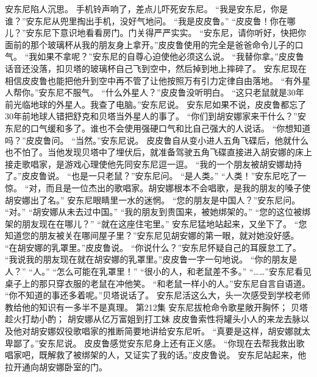 \documentclass[a4paper,12pt,UTF8,twoside]{ctexbook}
\begin{document}
        安东尼陷人沉思。 
        手机铃声响了，差点儿吓死安东尼。 
        “我是安东尼，你是谁？”安东尼从兜里掏出手机，没好气地问。 
        “我是皮皮鲁。” 
        “皮皮鲁！你在哪儿？”安东尼下意识地看看房门。门关得严严实实。 
        “安东尼，请你听好，快把你面前的那个玻璃杯从我的朋友身上拿开。”皮皮鲁使用的完全是爸爸命令儿子的口气。 
        “我如果不拿呢？”安东尼的自尊心迫使他必须这么说。 
        “我替你拿。”皮皮鲁话音还没落，扣贝塔的玻璃杯自己飞到空中，然后掉到地上摔碎了。 
        安东尼现在相信皮皮鲁也能把他升到空中再不管了让他按照万有引力定律自由落地。 
       “有外星人帮你。”安东尼不服气。 
        “什么外星人？”皮皮鲁没听明白。 
        “这只老鼠就是30年前光临地球的外星人。我查了电脑。”安东尼说。 
        安东尼如果不说，皮皮鲁都忘了30年前地球人错把舒克和贝塔当外星人的事了。 
        “你们到胡安娜家来干什么？”安东尼的口气缓和多了。谁也不会使用强硬口气和比自己强大的人说话。 
        “你想知道吗？”皮皮鲁问。 
        “当然。”安东尼说。 
        皮皮鲁自从变小进人五角飞碟后，他就什么也不怕了。当他发现贝塔中了埋伏后，就准备驾驶五角飞碟直接进入胡安娜的床上接走歌唱家，是游戏心理使他先同安东尼逗一逗。 
        “我的一个朋友被胡安娜劫持了。”皮皮鲁说。 
        “也是一只老鼠？”安东尼问。 
        “是人类。” 
        “人类！”安东尼吃了一惊。 
        “对，而且是一位杰出的歌唱家。胡安娜根本不会唱歌，是我的朋友的嗓子使胡安娜出了名。” 
        安东尼眼睛里一水的迷惘。 
        “您的朋友是中国人？”安东尼问。 
        “对。” 
        “胡安娜从未去过中国。” 
        “我的朋友到贵国来，被她绑架的。” 
        “您的这位被绑架的朋友现在在哪儿？” 
        “就在这座住宅里。” 
        安东尼猛地站起来，又坐下了。 
        “您知道您的朋友被关在哪间屋子里？”安东尼见胡安娜的第一眼，就对她没好感。 
        “在胡安娜的乳罩里。”皮皮鲁说。 
        “你说什么？”安东尼怀疑自己的耳膜怠工了。 
        “我说我的朋友现在就在胡安娜的乳罩里。”皮皮鲁一字一句地说。 
        “你的朋友是人？” 
        “人。” 
        “怎么可能在乳罩里！” 
        “很小的人，和老鼠差不多。” 
        “……”安东尼看见桌子上的那只穿衣服的老鼠在冲他笑。 
        “和老鼠一样小的人。”安东尼自言自语道。 
        “你不知道的事还多着呢。”贝塔说话了。 
        安东尼活这么大，头一次感受到学校老师教给他的知识有一多半不是真理。   第212集 
        安东尼拔枪命令歌星敞开胸怀； 
        贝塔趁火打劫小酌； 
        胡安娜从亿万富姐到打工妹   
        皮皮鲁索性将罐头小人的来龙去脉以及他对胡安娜奴役歌唱家的推断简要地讲给安东尼听。 
        “真要是这样，胡安娜就太卑鄙了。”安东尼说。 
        皮皮鲁感觉安东尼身上还有正义感。 
        “你现在去帮我救出歌唱家吧，既解救了被绑架的人，又证实了我的话。”皮皮鲁说。 
        安东尼站起来，他拉开通向胡安娜卧室的门。 
\end{document}
